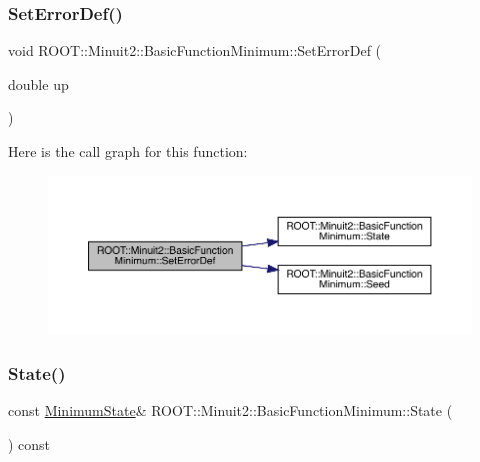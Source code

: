 \subsubsection{\texorpdfstring{SetErrorDef()}{SetErrorDef()}\hspace{0.1cm}{\footnotesize\ttfamily [3/3]}}
{\footnotesize\ttfamily void R\+O\+O\+T\+::\+Minuit2\+::\+Basic\+Function\+Minimum\+::\+Set\+Error\+Def (\begin{DoxyParamCaption}\item[{double}]{up }\end{DoxyParamCaption})\hspace{0.3cm}{\ttfamily [inline]}}

Here is the call graph for this function\+:
\nopagebreak
\begin{figure}[H]
\begin{center}
\leavevmode
\includegraphics[width=350pt]{de/d25/classROOT_1_1Minuit2_1_1BasicFunctionMinimum_ae89163fbfaccda743a6ca8d3add896dc_cgraph}
\end{center}
\end{figure}
\mbox{\label{classROOT_1_1Minuit2_1_1BasicFunctionMinimum_a57c7f1a6d3551fd329698e0fc9424fec}} 
\subsubsection{\texorpdfstring{State()}{State()}\hspace{0.1cm}{\footnotesize\ttfamily [1/3]}}
{\footnotesize\ttfamily const \mbox{\hyperlink{classROOT_1_1Minuit2_1_1MinimumState}{Minimum\+State}}\& R\+O\+O\+T\+::\+Minuit2\+::\+Basic\+Function\+Minimum\+::\+State (\begin{DoxyParamCaption}{ }\end{DoxyParamCaption}) const\hspace{0.3cm}{\ttfamily [inline]}}

